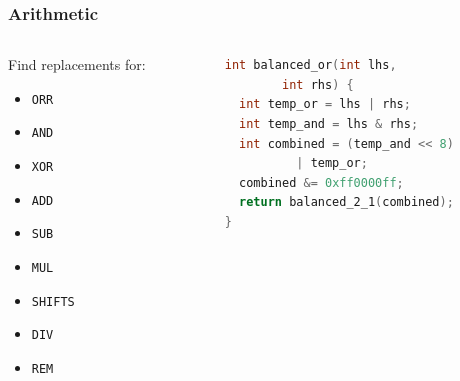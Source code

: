 \documentclass[11pt,t,usepdftitle=false,aspectratio=169]{beamer}
\begin{document}
\begin{frame}[fragile]
  \frametitle{Arithmetic}

  \begin{columns}[T] %
    \begin{column}{.28\textwidth}
      Find replacements for:
      \begin{itemize}
      \item \textcolor<2>{uibkorange}{\texttt{ORR}} 
      \item \texttt{AND}
      \item \texttt{XOR}
      \item \texttt{ADD}
      \item \texttt{SUB}
      \item \texttt{MUL}
      \item \texttt{SHIFTS}
      \item \texttt{DIV}
      \item \texttt{REM}
      \end{itemize}
    \end{column}%
    \hfill%
    \pause
    \vrule
    \hfill
    \begin{column}{.6\textwidth}
      \vspace{1cm}
      \begin{lstlisting}[language=C, basicstyle=\small]
int balanced_or(int lhs,
        int rhs) {
  int temp_or = lhs | rhs;
  int temp_and = lhs & rhs;
  int combined = (temp_and << 8)
          | temp_or;
  combined &= 0xff0000ff;
  return balanced_2_1(combined);
}
      \end{lstlisting}
    \end{column}
  \end{columns}
\end{frame}
\end{document}
